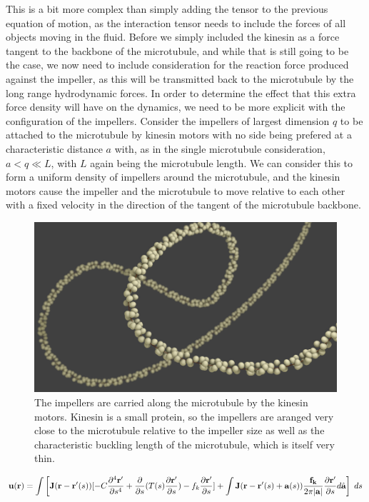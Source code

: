\documentclass[11pt]{ucthesis}
\def\br{{\bf r}}
\begin{document}
This is a bit more complex than simply adding the tensor to the previous equation of motion, as the interaction tensor needs to include the forces of all objects moving in the fluid. 
Before we simply included the kinesin as a force tangent to the backbone of the microtubule, and while that is still going to be the case, we now need to include consideration for the reaction force produced against the impeller, as this will be transmitted back to the microtubule by the long range hydrodynamic forces.
In order to determine the effect that this extra force density will have on the dynamics, we need to be more explicit with the configuration of the impellers.
Consider the impellers of largest dimension $q$ to be attached to the microtubule by kinesin motors with no side being prefered at a characteristic distance $a$ with, as in the single microtubule consideration, $a < q \ll L$, with $L$ again being the microtubule length. 
We can consider this to form a uniform density of impellers around the microtubule, and the kinesin motors cause the impeller and the microtubule to move relative to each other with a fixed velocity in the direction of the tangent of the microtubule backbone. 
\begin{figure}[htp]
\begin{center}
\includegraphics[width=\hsize]{impeller.png}
\caption{ 
The impellers are carried along the microtubule by the kinesin motors. Kinesin is a small protein, so the impellers are aranged very close to the microtubule relative to the impeller size as well as the characteristic buckling length of the microtubule, which is itself very thin.
}
\label{fig:quadforce}
\end{center}
\end{figure}
\begin{equation}
\label{eq:fluidmodel}
 \mathbf{u}(\br) =  \int \left[ \mathbf{J}(\br-\br^\prime(s))[-C \frac{\partial^4 \br^\prime}{\partial s^4} + \frac{\partial}{\partial s}(T(s)\frac{\partial \br^\prime}{\partial s}) - f_k \frac{\partial \br^\prime}{\partial s}] + \int  \mathbf{J}(\br-\br^\prime(s)+ \mathbf{a}(s)) \frac{ \mathbf{f_k}}{2\pi| \mathbf{a}|} \frac{\partial \br^\prime}{\partial s} d \hat{ \mathbf{a}} \right] \;ds
\end{equation}
\end{document}
